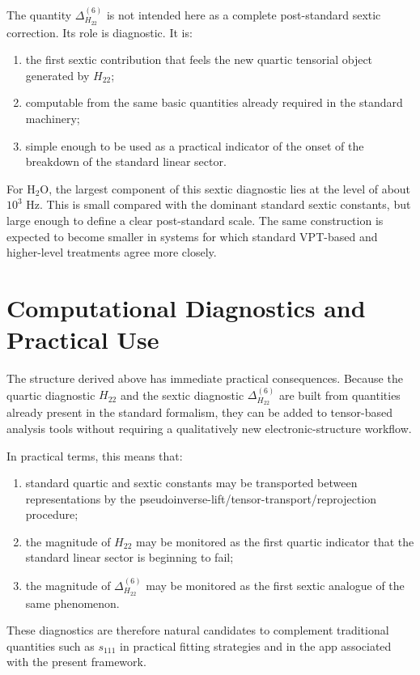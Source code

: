 \documentclass[journal=jacsat,manuscript=article]{achemso}
\begin{document}
The quantity $\Delta^{(6)}_{H_{22}}$ is not intended here as a complete
post-standard sextic correction. Its role is diagnostic. It is:
\begin{enumerate}
\item the first sextic contribution that feels the new quartic tensorial object
generated by $H_{22}$;
\item computable from the same basic quantities already required in the
standard machinery;
\item simple enough to be used as a practical indicator of the onset of the
breakdown of the standard linear sector.
\end{enumerate}

For H$_2$O, the largest component of this sextic diagnostic lies at the level
of about $10^3$ Hz. This is small compared with the dominant standard sextic
constants, but large enough to define a clear post-standard scale. The same
construction is expected to become smaller in systems for which standard
VPT-based and higher-level treatments agree more closely.

\section{Computational Diagnostics and Practical Use}

The structure derived above has immediate practical consequences. Because the
quartic diagnostic $H_{22}$ and the sextic diagnostic
$\Delta^{(6)}_{H_{22}}$ are built from quantities already present in the
standard formalism, they can be added to tensor-based analysis tools without
requiring a qualitatively new electronic-structure workflow.

In practical terms, this means that:
\begin{enumerate}
\item standard quartic and sextic constants may be transported between
representations by the pseudoinverse-lift/tensor-transport/reprojection
procedure;
\item the magnitude of $H_{22}$ may be monitored as the first quartic indicator
that the standard linear sector is beginning to fail;
\item the magnitude of $\Delta^{(6)}_{H_{22}}$ may be monitored as the first
sextic analogue of the same phenomenon.
\end{enumerate}
These diagnostics are therefore natural candidates to complement traditional
quantities such as $s_{111}$ in practical fitting strategies and in the app
associated with the present framework.
\end{document}
